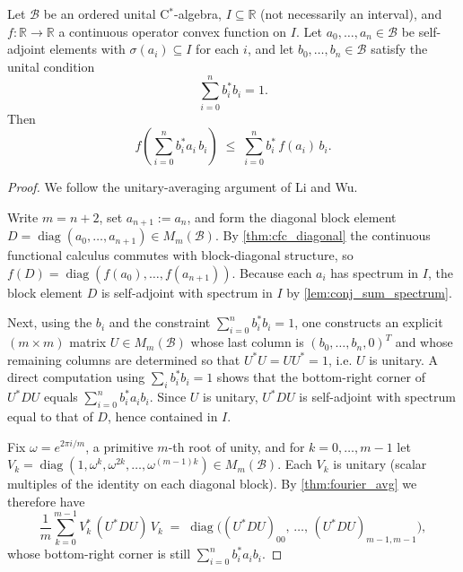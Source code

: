 \begin{theorem}
  \label{thm:jensen}
  \leanok
  Let $\mathcal{B}$ be an ordered unital C$^*$-algebra, $I \subseteq \mathbb{R}$ (not necessarily an
  interval), and $f : \mathbb{R} \to \mathbb{R}$ a continuous operator convex function on
  $I$.
  Let $a_0, \ldots, a_n \in \mathcal{B}$ be self-adjoint elements with
  $\sigma(a_i) \subseteq I$ for each $i$, and let $b_0, \ldots, b_n \in \mathcal{B}$
  satisfy the unital condition
  \[
    \sum_{i=0}^{n} b_i^* b_i = 1.
  \]
  Then
  \[
    f\!\left(\sum_{i=0}^{n} b_i^* a_i\, b_i\right)
    \;\leq\;
    \sum_{i=0}^{n} b_i^*\, f(a_i)\, b_i.
  \]

  \begin{proof}
    \leanok
    We follow the unitary-averaging argument of Li and Wu.

    Write $m = n + 2$, set $a_{n+1} := a_n$, and form the diagonal block element
    $D = \operatorname{diag}(a_0, \ldots, a_{n+1}) \in M_m(\mathcal{B})$.
    By \ref{thm:cfc_diagonal} the continuous functional calculus commutes with block-diagonal
    structure, so $f(D) = \operatorname{diag}(f(a_0), \ldots, f(a_{n+1}))$.
    Because each $a_i$ has spectrum in $I$, the block element $D$ is self-adjoint with
    spectrum in $I$ by \ref{lem:conj_sum_spectrum}.

    Next, using the $b_i$ and the constraint $\sum_{i=0}^n b_i^* b_i = 1$, one constructs
    an explicit $(m \times m)$ matrix $U \in M_m(\mathcal{B})$ whose last column is
    $(b_0, \ldots, b_n, 0)^T$ and whose remaining columns are determined so that
    $U^* U = U U^* = 1$, i.e. $U$ is unitary.
    A direct computation using $\sum_i b_i^* b_i = 1$ shows that the bottom-right
    corner of $U^* D U$ equals $\sum_{i=0}^n b_i^* a_i b_i$.
    Since $U$ is unitary, $U^* D U$ is self-adjoint with spectrum equal to that of $D$,
    hence contained in $I$.

    Fix $\omega = e^{2\pi i/m}$, a primitive $m$-th root of unity, and for
    $k = 0, \ldots, m-1$ let
    $V_k = \operatorname{diag}(1, \omega^k, \omega^{2k}, \ldots, \omega^{(m-1)k}) \in M_m(\mathcal{B})$.
    Each $V_k$ is unitary (scalar multiples of the identity on each diagonal block).
    By \ref{thm:fourier_avg} we therefore have
    \[
      \frac{1}{m} \sum_{k=0}^{m-1} V_k^*\,(U^* D U)\,V_k
      \;=\; \operatorname{diag}\!\bigl((U^* D U)_{00},\, \ldots,\, (U^* D U)_{m-1,m-1}\bigr),
    \]
    whose bottom-right corner is still $\sum_{i=0}^n b_i^* a_i b_i$.


\end{proof}
\end{theorem}
